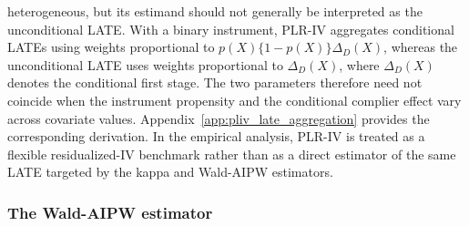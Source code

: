 \documentclass[12pt, a4paper, oneside]{article}
\theoremstyle{plain}
\theoremstyle{definition}
\begin{document}
heterogeneous, but its estimand should not generally be interpreted as the
unconditional LATE. With a binary instrument, PLR-IV aggregates conditional
LATEs using weights proportional to
$p(X)\{1-p(X)\}\Delta_D(X)$, whereas the unconditional LATE uses weights
proportional to $\Delta_D(X)$, where $\Delta_D(X)$ denotes the conditional
first stage. The two parameters therefore need not coincide when the
instrument propensity and the conditional complier effect vary across
covariate values. Appendix~\ref{app:pliv_late_aggregation} provides the
corresponding derivation. In the empirical analysis, PLR-IV is 
treated as a flexible residualized-IV benchmark rather than as a direct
estimator of the same LATE targeted by the kappa and Wald-AIPW estimators.



\subsubsection{The Wald-AIPW estimator}
\end{document}
